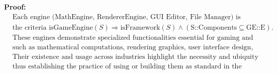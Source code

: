 \textbf{Proof:}
\begin{align*}
&\text{Each engine (MathEngine, RendererEngine, GUI Editor, File Manager) is considered a game engine if it satisfies} \\
&\text{the criteria } \text{isGameEngine}(S) \Rightarrow \text{isFramework}(S) \land (\text{S::Components} \subseteq \text{GE::E}). \\
&\text{These engines demonstrate specialized functionalities essential for gaming and diverse applications,} \\
&\text{such as mathematical computations, rendering graphics, user interface design, and file management.} \\
&\text{Their existence and usage across industries highlight the necessity and ubiquity of game engines,} \\
&\text{thus establishing the practice of using or building them as standard in the industry.}
\end{align*}

















